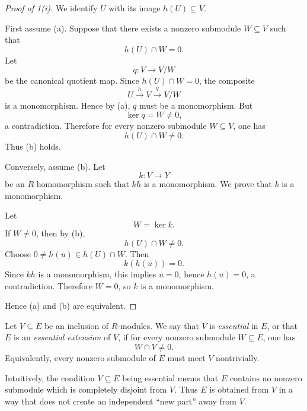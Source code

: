     \begin{proof}[Proof of 1(i)]
        We identify \(U\) with its image \(h(U)\subseteq V\).
        
        First assume (a). Suppose that there exists a nonzero submodule
        \(W\subseteq V\) such that
        \[
            h(U)\cap W=0.
        \]
        Let
        \[
            q:V\longrightarrow V/W
        \]
        be the canonical quotient map. Since \(h(U)\cap W=0\), the composite
        \[
            U\xrightarrow{\,h\,}V\xrightarrow{\,q\,}V/W
        \]
        is a monomorphism. Hence by (a), \(q\) must be a monomorphism. But
        \[
            \ker q=W\neq 0,
        \]
        a contradiction. Therefore for every nonzero submodule \(W\subseteq V\), one has
        \[
            h(U)\cap W\neq 0.
        \]
        Thus (b) holds.
        
        Conversely, assume (b). Let
        \[
            k:V\longrightarrow Y
        \]
        be an \(R\)-homomorphism such that \(kh\) is a monomorphism. We prove that \(k\)
        is a monomorphism.
        
        Let
        \[
            W=\ker k.
        \]
        If \(W\neq 0\), then by (b),
        \[
            h(U)\cap W\neq 0.
        \]
        Choose \(0\neq h(u)\in h(U)\cap W\). Then
        \[
            k(h(u))=0.
        \]
        Since \(kh\) is a monomorphism, this implies \(u=0\), hence \(h(u)=0\), a contradiction.
        Therefore \(W=0\), so \(k\) is a monomorphism.
        
        Hence (a) and (b) are equivalent.
        \end{proof}
        
        \begin{definition}
            Let \(V\subseteq E\) be an inclusion of \(R\)-modules. We say that \(V\) is
            \emph{essential} in \(E\), or that \(E\) is an \emph{essential extension} of \(V\),
            if for every nonzero submodule \(W\subseteq E\), one has
            \[
                W\cap V\neq 0.
            \]
            Equivalently, every nonzero submodule of \(E\) must meet \(V\) nontrivially.
            \end{definition}
            
            \begin{remark}
            Intuitively, the condition \(V\subseteq E\) being essential means that \(E\) contains
            no nonzero submodule which is completely disjoint from \(V\). Thus \(E\) is obtained
            from \(V\) in a way that does not create an independent ``new part'' away from \(V\).
            \end{remark}
            

